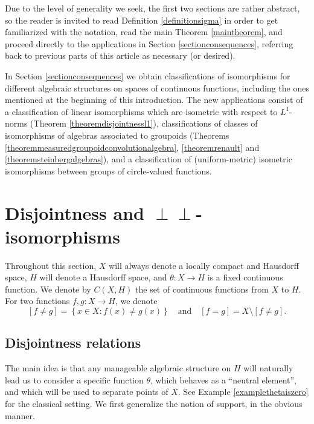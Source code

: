 \documentclass[letter,11pt]{amsart}
\theoremstyle{plain}		\newtheorem{theorem}[generalnumbering]{Theorem}
\theoremstyle{plain}		\newtheorem{corollary}[generalnumbering]{Corollary}
\theoremstyle{definition}		\newtheorem{definition}[generalnumbering]{Definition}
\theoremstyle{definition}		\newtheorem{example}[generalnumbering]{Example}
\theoremstyle{plain}		\newtheorem{proposition}[generalnumbering]{Proposition}
\theoremstyle{plain}		\newtheorem{lemma}[generalnumbering]{Lemma}
\theoremstyle{definition}
\newcommand{\perpp}{\perp\!\!\!\perp}
\begin{document}
Due to the level of generality we seek, the first two sections are rather abstract, so the reader is invited to read Definition \ref{definitionsigma} in order to get familiarized with the notation, read the main Theorem \ref{maintheorem}, and proceed directly to the applications in Section \ref{sectionconsequences}, referring back to previous parts of this article as necessary (or desired).

In Section \ref{sectionconsequences} we obtain classifications of isomorphisms for different algebraic structures on spaces of continuous functions, including the ones mentioned at the beginning of this introduction. The new applications consist of a classification of linear isomorphisms which are isometric with respect to $L^1$-norms (Theorem \ref{theoremdisjointnessl1}), classifications of classes of isomorphisms of algebras associated to groupoids (Theorems \ref{theoremmeasuredgroupoidconvolutionalgebra}, \ref{theoremrenault} and \ref{theoremsteinbergalgebras}), and a classification of (uniform-metric) isometric isomorphisms between groups of circle-valued functions.

\section{Disjointness and \texorpdfstring{$\perpp$}{⊥⊥}-isomorphisms}\label{sectiondisjointness}

Throughout this section, $X$ will always denote a locally compact and Hausdorff space, $H$ will denote a Hausdorff space, and $\theta\colon X\to H$ is a fixed continuous function. We denote by $C(X,H)$ the set of continuous functions from $X$ to $H$. For two functions $f,g\colon X\to H$, we denote
\[[f\neq g]=\left\{x\in X:f(x)\neq g(x)\right\}\quad\text{and}\quad[f=g]=X\setminus[f\neq g].\]

\subsection{Disjointness relations}

The main idea is that any manageable algebraic structure on $H$ will naturally lead us to consider a specific function $\theta$, which behaves as a ``neutral element'', and which will be used to separate points of $X$. See Example \ref{examplethetaiszero} for the classical setting. We first generalize the notion of support, in the obvious manner.
\end{document}

